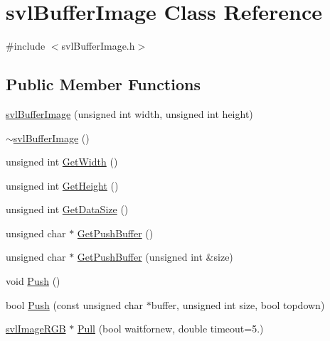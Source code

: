 \hypertarget{classsvl_buffer_image}{\section{svl\-Buffer\-Image Class Reference}
\label{classsvl_buffer_image}
}


{\ttfamily \#include $<$svl\-Buffer\-Image.\-h$>$}

\subsection*{Public Member Functions}
\begin{DoxyCompactItemize}
\item 
\hyperlink{classsvl_buffer_image_a6aee8b84561c7057dc92920c726f2b85}{svl\-Buffer\-Image} (unsigned int width, unsigned int height)
\item 
\hyperlink{classsvl_buffer_image_a3e0f56b816e77b910b4065e7355c2884}{$\sim$svl\-Buffer\-Image} ()
\item 
unsigned int \hyperlink{classsvl_buffer_image_a537ec231c13aa6329095b8ffae4bffa8}{Get\-Width} ()
\item 
unsigned int \hyperlink{classsvl_buffer_image_a7151eafe04f4591450cdf95d9b1591d1}{Get\-Height} ()
\item 
unsigned int \hyperlink{classsvl_buffer_image_a3381fd120533dabb59b0dd6c086f24a4}{Get\-Data\-Size} ()
\item 
unsigned char $\ast$ \hyperlink{classsvl_buffer_image_a654e6fab4be31c9b721520be57bed675}{Get\-Push\-Buffer} ()
\item 
unsigned char $\ast$ \hyperlink{classsvl_buffer_image_a9a05956d6d5ea74486e456aaab99a84d}{Get\-Push\-Buffer} (unsigned int \&size)
\item 
void \hyperlink{classsvl_buffer_image_a0749b519d476e542bb4ee2f47d1bf7a0}{Push} ()
\item 
bool \hyperlink{classsvl_buffer_image_ae2b2c23f7f3efeea69879089ce031cc3}{Push} (const unsigned char $\ast$buffer, unsigned int size, bool topdown)
\item 
\hyperlink{svl_types_8h_a7b03c3d61bbbbf8fe59585453969d250}{svl\-Image\-R\-G\-B} $\ast$ \hyperlink{classsvl_buffer_image_a3477386b9671df79ae53f740c1d13170}{Pull} (bool waitfornew, double timeout=5.)
\end{DoxyCompactItemize}


